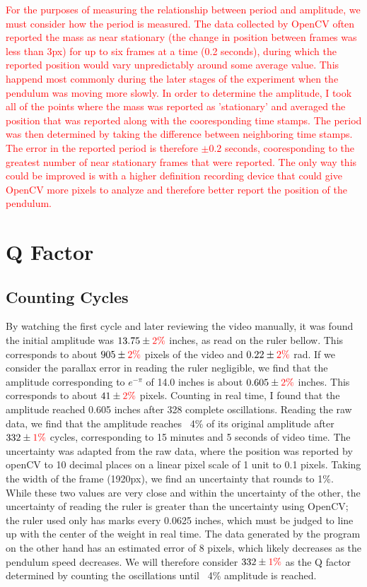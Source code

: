 \documentclass[11pt]{article}
\begin{document}
        \textcolor{red}{For the purposes of measuring the relationship between period and amplitude, we must consider how the period is measured. The data collected by OpenCV often reported the mass as near stationary (the change in position between frames was less than 3px) for up to six frames at a time (0.2 seconds), during which the reported position would vary unpredictably around some average value. This happend most commonly during the later stages of the experiment when the pendulum was moving more slowly. In order to determine the amplitude, I took all of the points where the mass was reported as 'stationary' and averaged the position that was reported along with the cooresponding time stamps. The period was then determined by taking the difference between neighboring time stamps. The error in the reported period is therefore $\pm 0.2$ seconds, cooresponding to the greatest number of near stationary frames that were reported. The only way this could be improved is with a higher definition recording device that could give OpenCV more pixels to analyze and therefore better report the position of the pendulum.
        }

    \section{Q Factor}
        \subsection{Counting Cycles}
            By watching the first cycle and later reviewing the video manually, it was found the initial amplitude was  $13.75 \pm \textcolor{red}{2\%}$ inches, as read on the ruler bellow. This corresponds to about $905 \pm \textcolor{red}{2\%}$ pixels of the video and $0.22 \pm \textcolor{red}{2\%}$ rad. If we consider the parallax error in reading the ruler negligible, we find that the amplitude corresponding to $e^{-\pi}$ of 14.0 inches is about $0.605 \pm \textcolor{red}{2\%}$ inches. This corresponds to about $41 \pm \textcolor{red}{2\%}$ pixels. Counting in real time, I found that the amplitude reached 0.605 inches after 328 complete oscillations. Reading the raw data, we find that the amplitude reaches ~4\% of its original amplitude after $332 \pm \textcolor{red}{1\%}$ cycles, corresponding to 15 minutes and 5 seconds of video time. The uncertainty was adapted from the raw data, where the position was reported by openCV to 10 decimal places on a linear pixel scale of 1 unit to 0.1 pixels. Taking the width of the frame (1920px), we find an uncertainty that rounds to 1\%. While these two values are very close and within the uncertainty of the other, the uncertainty of reading the ruler is greater than the uncertainty using OpenCV; the ruler used only has marks every 0.0625 inches, which must be judged to line up with the center of the weight in real time. The data generated by the program on the other hand has an estimated error of 8 pixels, which likely decreases as the pendulum speed decreases. We will therefore consider $332 \pm \textcolor{red}{1\%}$ as the Q factor determined by counting the oscillations until ~4\% amplitude is reached. 
        
\end{document}
